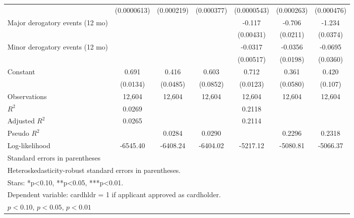\begin{table}[htbp]
{\begin{tabular}{l*{6}{c}}
                    & (0.0000613)         &  (0.000219)         &  (0.000377)         & (0.0000543)         &  (0.000263)         &  (0.000476)         \\
\addlinespace
Major derogatory events (12 mo)&                     &                     &                     &      -0.117\sym{***}&      -0.706\sym{***}&      -1.234\sym{***}\\
                    &                     &                     &                     &   (0.00431)         &    (0.0211)         &    (0.0374)         \\
\addlinespace
Minor derogatory events (12 mo)&                     &                     &                     &     -0.0317\sym{***}&     -0.0356\sym{*}  &     -0.0695\sym{*}  \\
                    &                     &                     &                     &   (0.00517)         &    (0.0198)         &    (0.0360)         \\
\addlinespace
Constant            &       0.691\sym{***}&       0.416\sym{***}&       0.603\sym{***}&       0.712\sym{***}&       0.361\sym{***}&       0.420\sym{***}\\
                    &    (0.0134)         &    (0.0485)         &    (0.0852)         &    (0.0123)         &    (0.0580)         &     (0.107)         \\
\midrule
Observations        &      12,604         &      12,604         &      12,604         &      12,604         &      12,604         &      12,604         \\
$R^2$               &      0.0269         &                     &                     &      0.2118         &                     &                     \\
Adjusted $R^2$      &      0.0265         &                     &                     &      0.2114         &                     &                     \\
Pseudo $R^2$        &                     &      0.0284         &      0.0290         &                     &      0.2296         &      0.2318         \\
Log-likelihood      &    -6545.40         &    -6408.24         &    -6404.02         &    -5217.12         &    -5080.81         &    -5066.37         \\
\bottomrule
\multicolumn{7}{l}{\footnotesize Standard errors in parentheses}\\
\multicolumn{7}{l}{\footnotesize Heteroskedasticity-robust standard errors in parentheses.}\\
\multicolumn{7}{l}{\footnotesize Stars: *p<0.10, **p<0.05, ***p<0.01.}\\
\multicolumn{7}{l}{\footnotesize Dependent variable: cardhldr = 1 if applicant approved as cardholder.}\\
\multicolumn{7}{l}{\footnotesize \sym{*} \(p<0.10\), \sym{**} \(p<0.05\), \sym{***} \(p<0.01\)}\\
\end{tabular}%
}
\end{table}

